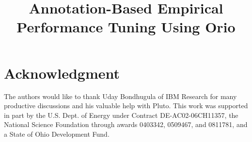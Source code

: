 \documentclass[conference]{IEEEtran}
\date{}
\begin{document}
\title{Annotation-Based Empirical Performance Tuning Using Orio}

\author{
\and 
{} 
\and 
{} 
} 

\maketitle

\begin{abstract}

\end{abstract}

\IEEEpeerreviewmaketitle





 
 

\section*{Acknowledgment} 
The authors would like to thank Uday Bondhugula of IBM Research for
many productive discussions and his valuable help with Pluto. This
work was supported in part by the U.S. Dept. of Energy under Contract
DE-AC02-06CH11357, the National Science Foundation through awards
0403342, 0509467, and 0811781, and a State of Ohio Development Fund.

\small
 
 
\end{document}
